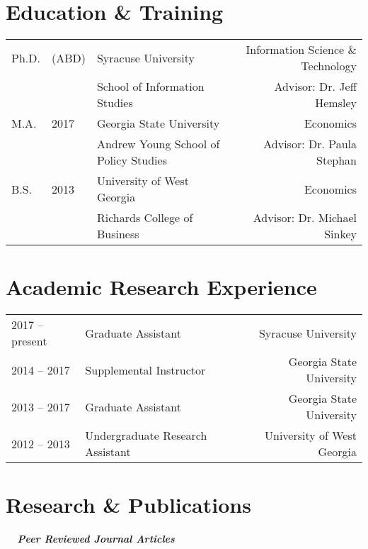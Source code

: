 \documentclass[12pt]{article}
\begin{document}
\section*{Education \& Training}

\begin{adjustbox}{width=\textwidth}
\begin{tabular}{l l l r}
Ph.D. & (ABD) &  Syracuse University & Information Science \& Technology \\
&& School of Information Studies & Advisor: Dr. Jeff Hemsley \\
M.A. & 2017 & Georgia State University & Economics \\
&& Andrew Young School of Policy Studies & Advisor: Dr. Paula Stephan \\
B.S. & 2013 & University of West Georgia & Economics \\
&& Richards College of Business & Advisor: Dr. Michael Sinkey
\end{tabular}
\end{adjustbox}


\section*{Academic Research Experience}

\begin{adjustbox}{width=\textwidth}
\begin{tabular}{l l r}
2017 -- present & Graduate Assistant & Syracuse University \\
2014 -- 2017 & Supplemental Instructor & Georgia State University \\
2013 -- 2017 & Graduate Assistant & Georgia State University \\
2012 -- 2013 & Undergraduate Research Assistant & University of West Georgia \\
\end{tabular}
\end{adjustbox}

\section*{Research \& Publications}

\vspace{2mm}
\noindent \textbf{\textit{\ \ Peer Reviewed Journal Articles}}
\begin{bibunit}\\
\\
\\
\putbib[publications]
\end{bibunit}
\end{document}

